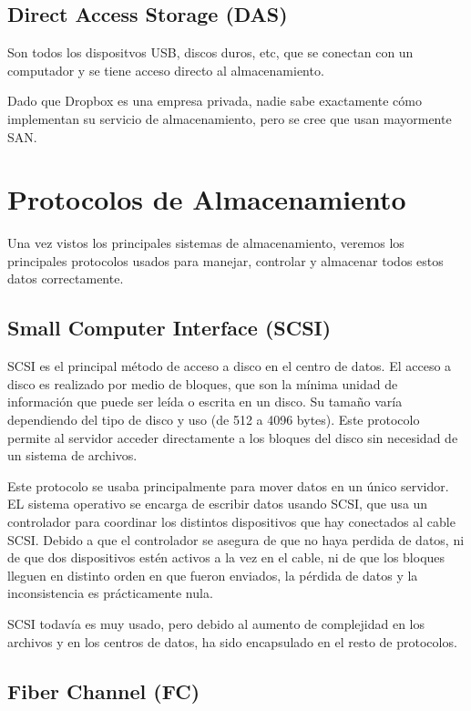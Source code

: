 \subsection{Direct Access Storage (DAS)}

Son todos los dispositvos USB, discos duros, etc, que se conectan con un computador y se tiene acceso directo al almacenamiento.


Dado que Dropbox es una empresa privada, nadie sabe exactamente cómo implementan su servicio de almacenamiento, pero se cree que usan mayormente SAN.

\section{Protocolos de Almacenamiento}

Una vez vistos los principales sistemas de almacenamiento, veremos los principales protocolos usados para manejar, controlar y almacenar todos estos datos correctamente.

\subsection{Small Computer Interface (SCSI)}

SCSI es el principal método de acceso a disco en el centro de datos. El acceso a disco es realizado por medio de bloques, que son la mínima unidad de información que puede ser leída o escrita en un disco. Su tamaño varía dependiendo del tipo de disco y uso (de 512 a 4096 bytes). Este protocolo permite al servidor acceder directamente a los bloques del disco sin necesidad de un sistema de archivos.

Este protocolo se usaba principalmente para mover datos en un único servidor. EL sistema operativo se encarga de escribir datos usando SCSI, que usa un controlador para coordinar los distintos dispositivos que hay conectados al cable SCSI. Debido a que el controlador se asegura de que no haya perdida de datos, ni de que dos dispositivos estén activos a la vez en el cable, ni de que los bloques lleguen en distinto orden en que fueron enviados, la pérdida de datos y la inconsistencia es prácticamente nula.

SCSI todavía es muy usado, pero debido al aumento de complejidad en los archivos y en los centros de datos, ha sido encapsulado en el resto de protocolos.

\subsection{Fiber Channel (FC)}

